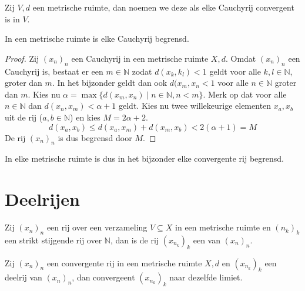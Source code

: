 \documentclass[main.tex]{subfiles}
\begin{document}
\begin{de}
  \label{de:metrische-ruimte-volledig}
  Zij $V,d$ een metrische ruimte, dan noemen we deze  als elke Cauchyrij convergent is in $V$.
\end{de}

\begin{st}
  \label{st:metrische-ruimte-cauchy-dan-begrensd}
  In een metrische ruimte is elke Cauchyrij begrensd.

  \begin{proof}
    Zij $(x_{n})_{n}$ een Cauchyrij in een metrische ruimte $X,d$.
    Omdat $(x_{n})_{n}$ een Cauchyrij is, bestaat er een $m\in \mathbb{N}$ zodat $d(x_{k},k_{l}) < 1$ geldt voor alle $k,l \in \mathbb{N}$, groter dan $m$.
    In het bijzonder geldt dan ook $d(x_{m},x_{n} < 1$ voor alle $n\in \mathbb{N}$ groter dan $m$.
    Kies nu $\alpha = \max\{ d(x_{m},x_{n}) \mid n\in \mathbb{N}, n < m \}$.
    Merk op dat voor alle $n\in \mathbb{N}$ dan $d(x_{n},x_{m}) < \alpha + 1$ geldt.
    Kies nu twee willekeurige elementen $x_{a},x_{b}$ uit de rij ($a,b\in \mathbb{N}$) en kies $M=2\alpha+2$.
    \[ d(x_{a},x_{b}) \le d(x_{a},x_{m}) + d(x_{m},x_{b}) < 2(\alpha+1) = M \]
    De rij $(x_{n})_{n}$ is dus begrensd door $M$.
  \end{proof}
\end{st}

\begin{gev}
  In elke metrische ruimte is dus in het bijzonder elke convergente rij begrensd.
\end{gev}

\section{Deelrijen}
\label{sec:deelrijen}

\begin{de}
  Zij $(x_{n})_{n}$ een rij over een verzameling $V\subseteq X$ in een metrische ruimte en $(n_{k})_{k}$ een strikt stijgende rij over $\mathbb{N}$, dan is de rij $(x_{n_{k}})_{k}$ een  van $(x_{n})_{n}$.
\end{de}

\begin{st}
  \label{st:deelrij-zelfde-limiet-als-convergente-moederrij}
  Zij $(x_{n})_{n}$ een convergente rij in een metrische ruimte $X,d$ en $(x_{n_{k}})_{k}$ een deelrij van $(x_{n})_{n}$, dan convergeent $(x_{n_{k}})_{k}$ naar dezelfde limiet.
\end{st}
\end{document}
